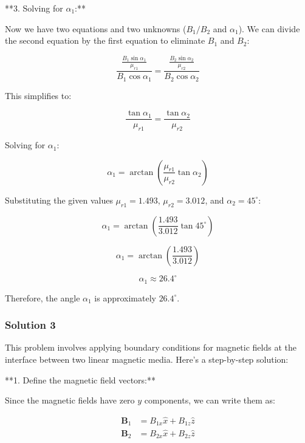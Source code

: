\documentclass{article}
\begin{document}
**3. Solving for $\alpha_1$:**

Now we have two equations and two unknowns ($B_1/B_2$ and $\alpha_1$). We can divide the second equation by the first equation to eliminate $B_1$ and $B_2$:

\begin{equation*}
\frac{\frac{B_1 \sin \alpha_1}{\mu_{r1}}}{B_1 \cos \alpha_1} = \frac{\frac{B_2 \sin \alpha_2}{\mu_{r2}}}{B_2 \cos \alpha_2}
\end{equation*}

This simplifies to:

\begin{equation*}
\frac{\tan \alpha_1}{\mu_{r1}} = \frac{\tan \alpha_2}{\mu_{r2}}
\end{equation*}

Solving for $\alpha_1$:

\begin{equation*}
\alpha_1 = \arctan \left( \frac{\mu_{r1}}{\mu_{r2}} \tan \alpha_2 \right)
\end{equation*}

Substituting the given values $\mu_{r1} = 1.493$, $\mu_{r2} = 3.012$, and $\alpha_2 = 45^\circ$:

\begin{equation*}
\alpha_1 = \arctan \left( \frac{1.493}{3.012} \tan 45^\circ \right) 
\end{equation*}

\begin{equation*}
\alpha_1 = \arctan \left( \frac{1.493}{3.012} \right) 
\end{equation*}

\begin{equation*}
\alpha_1 \approx 26.4^\circ
\end{equation*}

Therefore, the angle $\alpha_1$ is approximately $26.4^\circ$.

\subsubsection{Solution 3}
This problem involves applying boundary conditions for magnetic fields at the interface between two linear magnetic media. Here's a step-by-step solution:

**1. Define the magnetic field vectors:**

Since the magnetic fields have zero $y$ components, we can write them as:

\begin{align*}
\mathbf{B}_1 &= B_{1x} \hat{x} + B_{1z} \hat{z} \\
\mathbf{B}_2 &= B_{2x} \hat{x} + B_{2z} \hat{z}
\end{align*}
\end{document}
